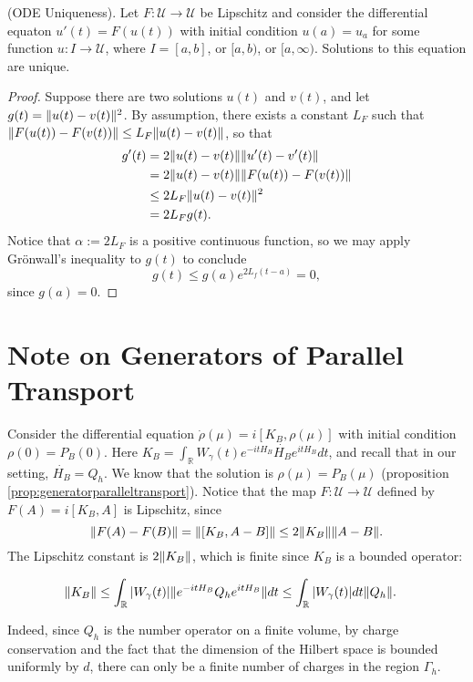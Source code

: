 \documentclass[12pt, letterpaper]{article}
\begin{document}
\begin{theorem}
(ODE Uniqueness). Let $F:\mathcal{U}\to\mathcal{U}$ be Lipschitz and consider the differential equaton $u'(t)=F(u(t))$ with initial condition $u(a) = u_a$ for some function $u:I\to\mathcal{U}$, where $I = [a,b]$, or $[a,b)$, or $[a,\infty)$. Solutions to this equation are unique.
\end{theorem}
\label{thm:gronwalluniqueness}
\begin{proof}
Suppose there are two solutions $u(t)$ and $v(t)$, and let $g(t) = \lVert u(t)-v(t) \rVert^2$. By assumption, there exists a constant $L_F$ such that $\lVert F(u(t))-F(v(t)) \rVert \leq L_F \lVert u(t)-v(t) \rVert$, so that
\[\begin{aligned}
g'(t) &= 2\lVert u(t)-v(t) \rVert\lVert u'(t)-v'(t) \rVert\\
&=2\lVert u(t)-v(t) \rVert\lVert F(u(t))-F(v(t)) \rVert\\
&\leq 2L_F\lVert u(t)-v(t) \rVert^2\\
&= 2L_F g(t).
\end{aligned}\]
Notice that $\alpha := 2L_F$ is a positive continuous function, so we may apply Gr\"{o}nwall's inequality to $g(t)$ to conclude
\[g(t) \leq g(a)e^{2L_f(t-a)} = 0,\]
since $g(a)=0$.
\end{proof}

\section{Note on Generators of Parallel Transport}
Consider the differential equation $\dot{\rho}(\mu) = i[K_B,\rho(\mu)]$ with initial condition $\rho(0)=P_B(0)$. Here $K_B = \int_\mathbb{R}W_\gamma(t)e^{-itH_B}\dot{H_B}e^{itH_B}dt$, and recall that in our setting, $\dot{H_B} = Q_h$. We know that the solution is $\rho(\mu) = P_B(\mu)$ (proposition \ref{prop:generatorparalleltransport}). Notice that the map $F:\mathcal{U}\to\mathcal{U}$ defined by $F(A) = i[K_B,A]$ is Lipschitz, since
\[\lVert F(A)-F(B) \rVert = \lVert [K_B,A-B] \rVert \leq 2\lVert K_B \rVert\lVert A-B \rVert.\]
The Lipschitz constant is $2\lVert K_B \rVert$, which is finite since $K_B$ is a bounded operator:

\[\begin{aligned}
\lVert K_B \rVert &\leq \int_\mathbb{R}|W_\gamma(t)| \lVert e^{-itH_B}Q_he^{itH_B} \rVert dt\leq \int_\mathbb{R}|W_\gamma(t)|dt\lVert Q_h \rVert.
\end{aligned}\]

Indeed, since $Q_h$ is the number operator on a finite volume, by charge conservation and the fact that the dimension of the Hilbert space is bounded uniformly by $d$, there can only be a finite number of charges in the region $\Gamma_h$.
\end{document}

